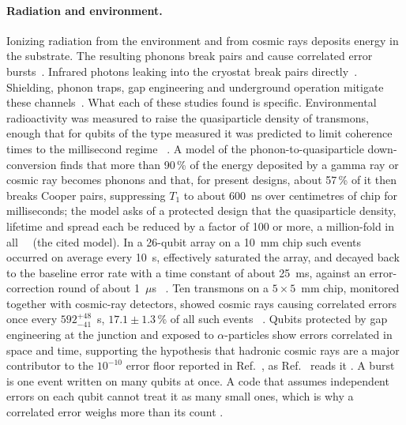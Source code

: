 \paragraph{Radiation and environment.} Ionizing radiation from the environment and from cosmic
rays deposits energy in the substrate. The resulting phonons break pairs and cause correlated
error bursts~\cite{Vepsalainen2020,Cardani2021,McEwen2022}. Infrared photons leaking into the
cryostat break pairs directly~\cite{Barends2011,Houzet2019}. Shielding, phonon traps,
gap engineering and underground operation mitigate these channels~\cite{Cardani2021,Martinis2021,Kurter2022}.
What each of these studies found is specific. Environmental radioactivity was measured to raise the quasiparticle density of
transmons, enough that for qubits of the type measured it was predicted to limit coherence times to the millisecond
regime~\cite{Vepsalainen2020} \observed. A model
of the phonon-to-quasiparticle down-conversion finds that more than 90\,\% of the energy deposited by a gamma ray or cosmic ray becomes
phonons and that, for present designs, about 57\,\% of it then breaks Cooper pairs, suppressing $T_1$ to about 600~ns over centimetres of
chip for milliseconds; the model asks of a protected design that the quasiparticle density, lifetime and spread each be reduced by a
factor of 100 or more, a million-fold in all~\cite{Martinis2021} \calc\ (the cited model). In a 26-qubit array on a 10~mm chip such
events occurred on average every 10~s, effectively saturated the array, and decayed back to the baseline error rate with a time
constant of about 25~ms, against an error-correction round of about 1~$\mu$s~\cite{McEwen2022} \observed. Ten transmons on a
$5\times5$~mm chip, monitored together with cosmic-ray detectors, showed cosmic rays causing correlated errors once every
$592^{+48}_{-41}$~s, $17.1\pm1.3$\,\% of all such events~\cite{Harrington2025} \observed. Qubits protected by gap engineering at the
junction and exposed to $\alpha$-particles show errors correlated in space and time, supporting the hypothesis that hadronic cosmic rays
are a major contributor to the $10^{-10}$ error floor reported in Ref.~\cite{GoogleWillow2025}, as Ref.~\cite{Pinckney2026} reads it
\observed. A burst is
one event written on many qubits at once. A code that assumes independent errors on each qubit cannot treat it as many small ones, which
is why a correlated error weighs more than its count \interp.
